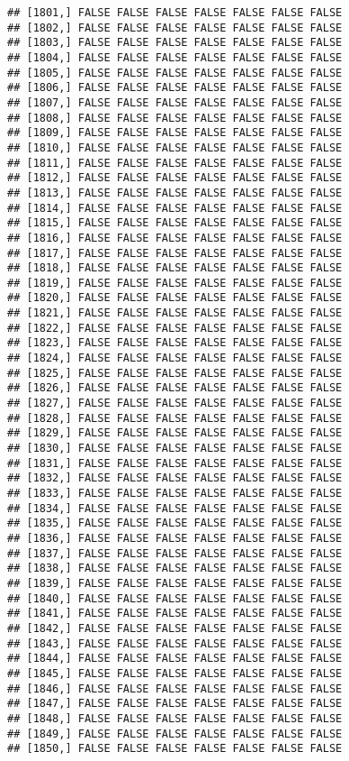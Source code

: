 \documentclass[
]{article}
\begin{document}
\begin{verbatim}
## [1801,] FALSE FALSE FALSE FALSE FALSE FALSE FALSE
## [1802,] FALSE FALSE FALSE FALSE FALSE FALSE FALSE
## [1803,] FALSE FALSE FALSE FALSE FALSE FALSE FALSE
## [1804,] FALSE FALSE FALSE FALSE FALSE FALSE FALSE
## [1805,] FALSE FALSE FALSE FALSE FALSE FALSE FALSE
## [1806,] FALSE FALSE FALSE FALSE FALSE FALSE FALSE
## [1807,] FALSE FALSE FALSE FALSE FALSE FALSE FALSE
## [1808,] FALSE FALSE FALSE FALSE FALSE FALSE FALSE
## [1809,] FALSE FALSE FALSE FALSE FALSE FALSE FALSE
## [1810,] FALSE FALSE FALSE FALSE FALSE FALSE FALSE
## [1811,] FALSE FALSE FALSE FALSE FALSE FALSE FALSE
## [1812,] FALSE FALSE FALSE FALSE FALSE FALSE FALSE
## [1813,] FALSE FALSE FALSE FALSE FALSE FALSE FALSE
## [1814,] FALSE FALSE FALSE FALSE FALSE FALSE FALSE
## [1815,] FALSE FALSE FALSE FALSE FALSE FALSE FALSE
## [1816,] FALSE FALSE FALSE FALSE FALSE FALSE FALSE
## [1817,] FALSE FALSE FALSE FALSE FALSE FALSE FALSE
## [1818,] FALSE FALSE FALSE FALSE FALSE FALSE FALSE
## [1819,] FALSE FALSE FALSE FALSE FALSE FALSE FALSE
## [1820,] FALSE FALSE FALSE FALSE FALSE FALSE FALSE
## [1821,] FALSE FALSE FALSE FALSE FALSE FALSE FALSE
## [1822,] FALSE FALSE FALSE FALSE FALSE FALSE FALSE
## [1823,] FALSE FALSE FALSE FALSE FALSE FALSE FALSE
## [1824,] FALSE FALSE FALSE FALSE FALSE FALSE FALSE
## [1825,] FALSE FALSE FALSE FALSE FALSE FALSE FALSE
## [1826,] FALSE FALSE FALSE FALSE FALSE FALSE FALSE
## [1827,] FALSE FALSE FALSE FALSE FALSE FALSE FALSE
## [1828,] FALSE FALSE FALSE FALSE FALSE FALSE FALSE
## [1829,] FALSE FALSE FALSE FALSE FALSE FALSE FALSE
## [1830,] FALSE FALSE FALSE FALSE FALSE FALSE FALSE
## [1831,] FALSE FALSE FALSE FALSE FALSE FALSE FALSE
## [1832,] FALSE FALSE FALSE FALSE FALSE FALSE FALSE
## [1833,] FALSE FALSE FALSE FALSE FALSE FALSE FALSE
## [1834,] FALSE FALSE FALSE FALSE FALSE FALSE FALSE
## [1835,] FALSE FALSE FALSE FALSE FALSE FALSE FALSE
## [1836,] FALSE FALSE FALSE FALSE FALSE FALSE FALSE
## [1837,] FALSE FALSE FALSE FALSE FALSE FALSE FALSE
## [1838,] FALSE FALSE FALSE FALSE FALSE FALSE FALSE
## [1839,] FALSE FALSE FALSE FALSE FALSE FALSE FALSE
## [1840,] FALSE FALSE FALSE FALSE FALSE FALSE FALSE
## [1841,] FALSE FALSE FALSE FALSE FALSE FALSE FALSE
## [1842,] FALSE FALSE FALSE FALSE FALSE FALSE FALSE
## [1843,] FALSE FALSE FALSE FALSE FALSE FALSE FALSE
## [1844,] FALSE FALSE FALSE FALSE FALSE FALSE FALSE
## [1845,] FALSE FALSE FALSE FALSE FALSE FALSE FALSE
## [1846,] FALSE FALSE FALSE FALSE FALSE FALSE FALSE
## [1847,] FALSE FALSE FALSE FALSE FALSE FALSE FALSE
## [1848,] FALSE FALSE FALSE FALSE FALSE FALSE FALSE
## [1849,] FALSE FALSE FALSE FALSE FALSE FALSE FALSE
## [1850,] FALSE FALSE FALSE FALSE FALSE FALSE FALSE

\end{verbatim}
\end{document}
